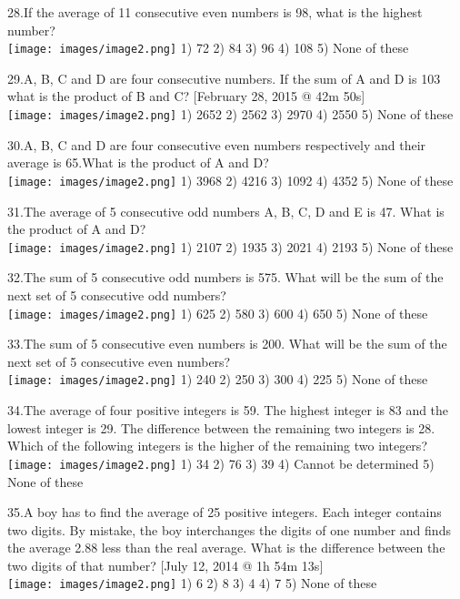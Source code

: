 \documentclass[
]{article}
\begin{document}
28.If the average of 11 consecutive even numbers is 98, what is the highest number?  \\
\texttt{[image: images/image2.png]}   1) 72 	2) 84 	3) 96 	4) 108 	5) None of these

29.A, B, C and D are four consecutive numbers. If the sum of A and D is 103 what is the product of B and C? [February 28, 2015 @ 42m 50s]  \\
\texttt{[image: images/image2.png]}   	1) 2652 	2) 2562 	3) 2970 	4) 2550 	5) None of these

30.A, B, C and D are four consecutive even numbers respectively and their average is 65.What is the product of A and D?  \\
\texttt{[image: images/image2.png]}  1) 3968 	2) 4216 	3) 1092 	4) 4352 	5) None of these

31.The average of 5 consecutive odd numbers A, B, C, D and E is 47. What is the product of A and D?  \\
\texttt{[image: images/image2.png]}   1) 2107 	2) 1935 	3) 2021 	4) 2193 	5) None of these

32.The sum of 5 consecutive odd numbers is 575. What will be the sum of the next set of 5 consecutive odd numbers?  \\
\texttt{[image: images/image2.png]}   1) 625 	2) 580 	3) 600 	4) 650 	5) None of these

33.The sum of 5 consecutive even numbers is 200. What will be the sum of the next set of 5 consecutive even numbers?  \\
\texttt{[image: images/image2.png]}   1) 240 	2) 250 	3) 300 	4) 225 	5) None of these

34.The average of four positive integers is 59. The highest integer is 83 and the lowest integer is 29. The difference between the remaining two integers is 28. Which of the following integers is the higher of the remaining two integers?  \\
\texttt{[image: images/image2.png]}   1) 34 	2) 76 	3) 39 4) Cannot be determined 	5) None of these

35.A boy has to find the average of 25 positive integers. Each integer contains two digits. By mistake, the boy interchanges the digits of one number and finds the average 2.88 less than 	the real average. What is the difference between the two digits of that number? [July 12, 2014 @ 1h 54m 13s]  \\
\texttt{[image: images/image2.png]}   1) 6 	2) 8 	3) 4 	4) 7 	5) None of these
\newpage
\end{document}
